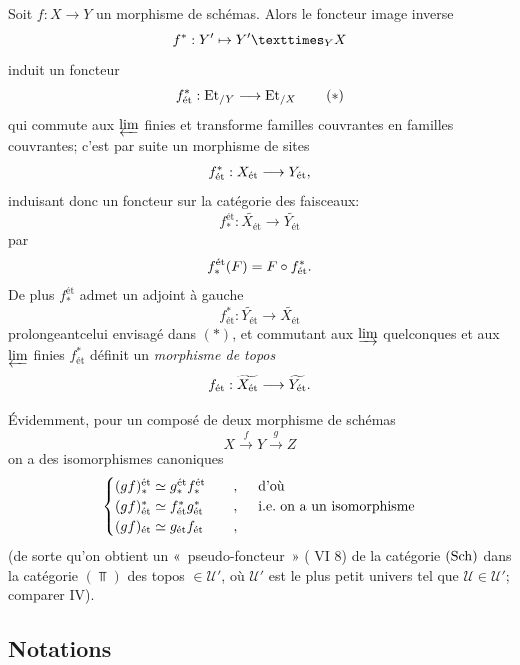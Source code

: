 \documentclass[10pt]{../fichiers-configuration-latex/smfart}
\begin{document}
\subsection{}

Soit $f : X \to Y$ un morphisme de schémas. Alors le foncteur image
inverse
$$
f^{\ast} : Y' \mapsto \fprod{Y'}{X}{Y}
$$
induit un foncteur
\begin{equation*}
f^{\ast}_{\text{ét}} : \Et_{/Y} \to \Et_{/X}\tag{$\ast$}
\end{equation*}
qui commute aux $\varprojlim$ finies et transforme familles couvrantes
en familles couvrantes; c'est par suite un morphisme de sites
$$
f^{\ast}_{\text{ét}} : X_{\text{ét}} \to Y_{\text{ét}}{\quoi},
$$
induisant donc un foncteur sur la catégorie des faisceaux:
$$
f^{\text{ét}}_{\ast} : \widetilde{X_{\text{ét}}} \to \widetilde{Y_{\text{ét}}}
$$
par
$$
f^{\text{ét}}_{\ast}  (F) = F \circ f^{\ast}_{\text{ét}}{}.
$$
De plus $f^{\text{ét}}_{\ast}$ admet un adjoint à gauche
$$
f^{\ast}_{\text{ét}} : \widetilde{Y_{\text{ét}}} \to
\widetilde{X_{\text{ét}}}
$$
prolongeant\pageoriginale celui envisagé dans $(\ast)$, et commutant aux
$\varinjlim$ quelconques et aux $\varprojlim$ finies \ie
$f^{\ast}_{\text{ét}}$ définit un \emph{morphisme de topos}
$$
f_{\text{ét}} : \widetilde{X_{\text{ét}}} \to \widetilde{Y_{\text{ét}}}{\quoi}.
$$

Évidemment, pour un composé de deux morphisme de schémas
$$
X \xrightarrow{f} Y \xrightarrow{g} Z
$$
on a des isomorphismes canoniques
\begin{equation*}
\begin{cases}
(gf)^{\text{ét}}_{\ast} \simeq g_{\ast}^{\text{ét}}
  f_{\ast}^{\text{ét}} &\quad,\quad \mbox{ d'où}\\
(gf)^{\ast}_{\text{ét}} \simeq f^{\ast}_{\text{ét}}
  g^{\ast}_{\text{ét}} &\quad,\quad \mbox{ {i.e.}\kern.3emon a
    un isomorphisme}\\
(gf)_{\text{ét}} \simeq g_{\text{ét}} f_{\text{ét}}&\quad,\quad
\end{cases}
\end{equation*}
(de sorte qu'on obtient un « pseudo-foncteur » ( VI 8) de la
catégorie $(\operatorname{Sch})$ dans la catégorie $(\Top)$ des topos $\in 𝒰'$, où
$𝒰'$ est le plus petit univers tel que $𝒰 \in
𝒰'$; comparer IV).

\subsection{Notations}
\end{document}
